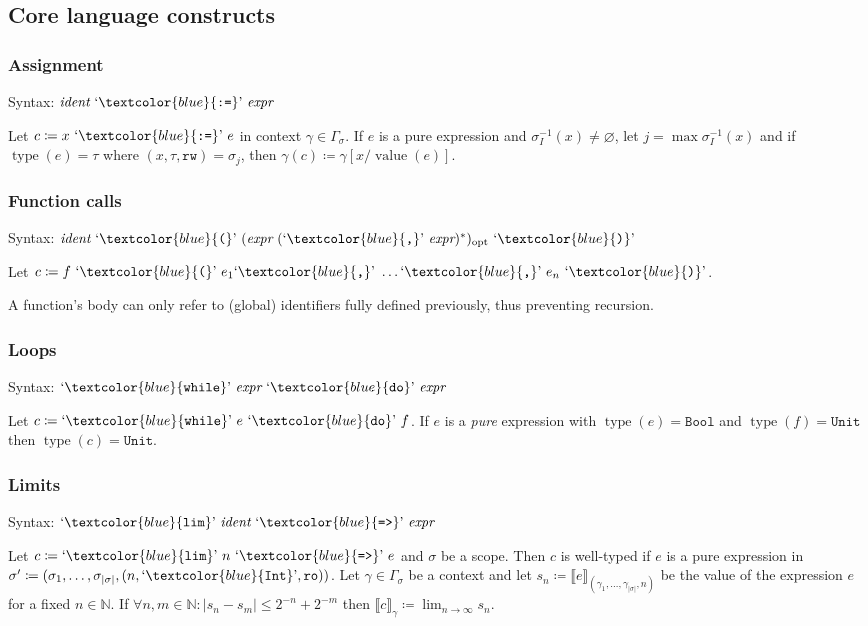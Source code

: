 \documentclass[a4paper,11pt,parskip=half]{scrartcl}
\newcommand*\lang[1]{\text`\textcolor{blue}{\text{\ttfamily{#1}}}\text'{}}
\newcommand*\optional[1]{#1\ensuremath{{}_{\textrm{opt}}}}
\newcommand*\ctxval[2][\gamma]{\llbracket{#2}\rrbracket_{#1}}
\newcommand*\scro{\mathtt{ro}}
\newcommand*\scrw{\mathtt{rw}}
\begin{document}
\subsection{Core language constructs}
\subsubsection{Assignment}
Syntax: $\emph{ident}~\lang{:=}~\emph{expr}$

Let $c\coloneqq x~\lang{:=}~e$ in context $\gamma\in\Gamma_\sigma$.
If $e$ is a pure expression
and $\sigma_I^{-1}(x)\neq\varnothing$, let $j=\max\sigma_I^{-1}(x)$ and
if $\operatorname{type}(e)=\tau$ where $(x,\tau,\scrw)=\sigma_j$, then
$\gamma(c)\coloneqq\gamma[x/\operatorname{value}(e)]$.

\subsubsection{Function calls}
Syntax:
$\emph{ident}~\lang(~(\emph{expr}~\optional{(\lang,~\emph{expr})^*)}~\lang)$

Let $c\coloneqq f~\lang(~e_1\lang,~\ldots\lang,~e_n~\lang)$.

A function's body can only refer to (global) identifiers fully defined
previously, thus preventing recursion.

\subsubsection{Loops}
Syntax: $\lang{while}~\emph{expr}~\lang{do}~\emph{expr}$

Let $c\coloneqq\lang{while}~e~\lang{do}~f$.
If $e$ is a \emph{pure} expression with $\operatorname{type}(e)=\texttt{Bool}$
and $\operatorname{type}(f)=\texttt{Unit}$
then $\operatorname{type}(c)=\texttt{Unit}$.

\subsubsection{Limits}
Syntax: $\lang{lim}~\emph{ident}~\lang{=>}~\emph{expr}$

Let $c\coloneqq\lang{lim}~n~\lang{=>}~e$ and $\sigma$ be a scope.
Then $c$ is well-typed if $e$ is a pure expression in
$\sigma'\coloneqq(\sigma_1,\ldots,\sigma_{|\sigma|},(n,\lang{Int},\scro))$.
Let $\gamma\in\Gamma_\sigma$ be a context and
let $s_n\coloneqq\ctxval[(\gamma_1,\ldots,\gamma_{|\sigma|},n)] e$ be the
value of the expression $e$ for a fixed $n\in\mathbb N$. If
$\forall n,m\in\mathbb N:|s_n-s_m|\leq2^{-n}+2^{-m}$
then $\ctxval c\coloneqq\lim_{n\to\infty} s_n$.
\end{document}
